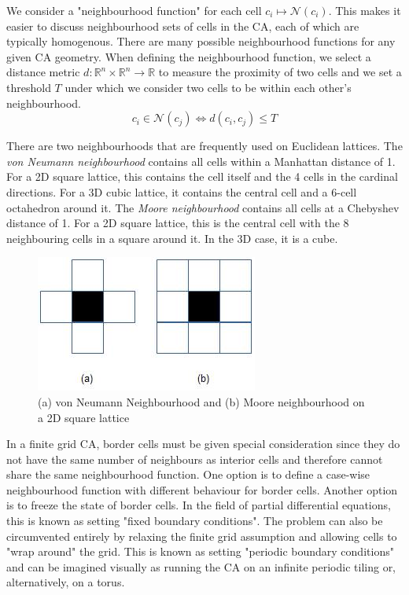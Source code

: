 We consider a "neighbourhood function" for each cell $c_i \mapsto \mathcal{N}(c_i)$. This makes it easier to discuss neighbourhood sets of cells in the CA, each of which are typically homogenous. There are many possible neighbourhood functions for any given CA geometry. When defining the neighbourhood function, we select a distance metric $d:\mathbb{R}^n \times \mathbb{R}^n \to \mathbb{R}$ to measure the proximity of two cells and we set a threshold $T$ under which we consider two cells to be within each other's neighbourhood.
\[c_i \in \mathcal{N}(c_j) \iff d(c_i, c_j) \leq T\]

There are two neighbourhoods that are frequently used on Euclidean lattices. The \textit{von Neumann neighbourhood} contains all cells within a Manhattan distance of 1. For a 2D square lattice, this contains the cell itself and the 4 cells in the cardinal directions. For a 3D cubic lattice, it contains the central cell and a 6-cell octahedron around it. The \textit{Moore neighbourhood} contains all cells at a Chebyshev distance of 1. For a 2D square lattice, this is the central cell with the 8 neighbouring cells in a square around it. In the 3D case, it is a cube.

\begin{figure}[!h]
\centering
\includegraphics[width=.3\textwidth]{images/neighbourhoods.png}
\caption{(a) von Neumann Neighbourhood and (b) Moore neighbourhood on a 2D square lattice \cite{debasis2011survey}}
\label{fig:neighbourhoods}
\end{figure}

In a finite grid CA, border cells must be given special consideration since they do not have the same number of neighbours as interior cells and therefore cannot share the same neighbourhood function. One option is to define a case-wise neighbourhood function with different behaviour for border cells. Another option is to freeze the state of border cells. In the field of partial differential equations, this is known as setting "fixed boundary conditions".  The problem can also be circumvented entirely by relaxing the finite grid assumption and allowing cells to "wrap around" the grid. This is known as setting "periodic boundary conditions" and can be imagined visually as running the CA on an infinite periodic tiling or, alternatively, on a torus.\\


